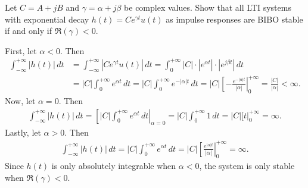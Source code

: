 \documentclass{report}
\begin{document}
\begin{example}
    Let $C=A+jB$ and $\gamma = \alpha + j\beta$ be complex values. 
    Show that all LTI systems with exponential decay $h(t)=Ce^{\gamma t}u(t)$ as impulse responses are BIBO stable if and only if $\Re(\gamma) < 0$. 
\end{example}
\begin{solution}
    First, let $\alpha < 0$. Then 
    \begin{align*}
        \int_{-\infty}^{+\infty} |h(t)| \,dt &= \int_{-\infty}^{+\infty} |Ce^{\gamma t}u(t)| \,dt = \int_{0}^{+\infty} |C|\cdot |e^{\alpha t}|\cdot |e^{j\beta t}| \,dt \\
        &= |C|\int_{0}^{+\infty} e^{\alpha t}\,dt = |C|\int_{0}^{+\infty} e^{-|\alpha| t}\,dt = |C| \left[-\frac{e^{-|\alpha|t}}{|\alpha|}\right|_0^{+\infty} = \frac{|C|}{|\alpha|} < \infty.
    \end{align*}
    Now, let $\alpha = 0$. Then 
    \begin{align*}
        \int_{-\infty}^{+\infty} |h(t)| \,dt = \left[|C|\int_{0}^{+\infty} e^{\alpha t}\,dt\right|_{\alpha=0}  = |C|\int_{0}^{+\infty} 1\,dt = |C| \big[t\big|_0^{+\infty} = \infty.
    \end{align*}
    Lastly, let $\alpha>0$. Then
    \begin{align*}
        \int_{-\infty}^{+\infty} |h(t)| \,dt = |C|\int_{0}^{+\infty} e^{\alpha t}\,dt = |C| \left[\frac{e^{|\alpha|t}}{|\alpha|}\right|_0^{+\infty} = \infty.
    \end{align*}
    Since $h(t)$ is only absolutely integrable when $\alpha<0$, the system is only stable when $\Re(\gamma)<0$. \\
\end{solution}
\end{document}
